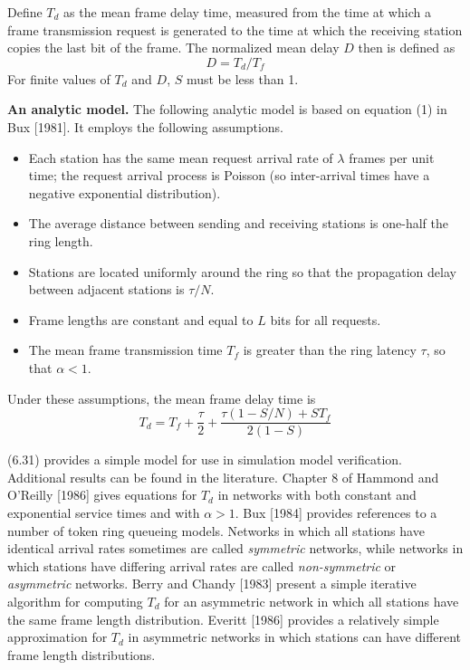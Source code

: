 Define $T_d$ as the mean frame delay time, measured from the time at which a frame transmission request is generated to the time at which the receiving station copies the last bit of the frame. The normalized mean delay $D$ then is defined as
\begin{equation} D=T_d/T_f \end{equation}
For finite values of $T_d$ and $D$, $S$ must be less than 1.

\noindent\textbf{An analytic model.} The following analytic model is based on equation (1) in Bux [1981]. It employs the following assumptions.
\begin{itemize}
\item Each station has the same mean request arrival rate of $\lambda$ frames per unit time; the request arrival process is Poisson (so inter-arrival times have a negative exponential distribution).
\item The average distance between sending and receiving stations is one-half the ring length.
\item Stations are located uniformly around the ring so that the propagation delay between adjacent stations is $\tau/N$.
\item Frame lengths are constant and equal to $L$ bits for all requests.
\item The mean frame transmission time $T_f$ is greater than the ring latency $\tau$, so that $\alpha<1$.
\end{itemize}
Under these assumptions, the mean frame delay time is
\begin{equation} T_d=T_f+\frac{\tau}{2}+\frac{\tau(1-S/N)+ST_f}{2(1-S)} \end{equation}

(6.31) provides a simple model for use in simulation model verification. Additional results can be found in the literature. Chapter 8 of Hammond and O'Reilly [1986] gives equations for $T_d$ in networks with both constant and exponential service times and with $\alpha>1$. Bux [1984] provides references to a number of token ring queueing models. Networks in which all stations have identical arrival rates sometimes are called \emph{symmetric} networks, while networks in which stations have differing arrival rates are called \emph{non-symmetric} or \emph{asymmetric} networks. Berry and Chandy [1983] present a simple iterative algorithm for computing $T_d$ for an asymmetric network in which all stations have the same frame length distribution. Everitt [1986] provides a relatively simple approximation for $T_d$ in asymmetric networks in which stations can have different frame length distributions.

